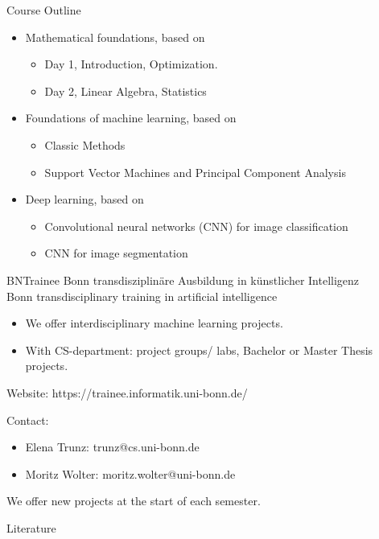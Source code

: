 \documentclass{beamer}
\begin{document}
    \begin{frame}{Course Outline}
      \begin{itemize}
        \item Mathematical foundations, based on \cite{deisenroth_faisal_ong_2020}
         \begin{itemize}
            \item  Day 1, Introduction, Optimization.
            \item  Day 2, Linear Algebra, Statistics
         \end{itemize}
        \item Foundations of machine learning, based on \cite{deisenroth_faisal_ong_2020}
        \begin{itemize}
          \item Classic Methods
          \item Support Vector Machines and Principal Component Analysis
        \end{itemize}
        \item Deep learning, based on \cite{Goodfellow_et_al_2016}
        \begin{itemize}
          \item Convolutional neural networks (CNN) for image classification
          \item CNN for image segmentation
        \end{itemize}
      \end{itemize}
    \end{frame}

    \begin{frame}{BNTrainee}
      Bonn transdisziplinäre Ausbildung in künstlicher Intelligenz \\
      Bonn transdisciplinary training in artificial intelligence
      \begin{itemize}
        \item We offer interdisciplinary machine learning projects.
        \item With CS-department: project groups/ labs, Bachelor or Master Thesis projects.
      \end{itemize}
      Website: https://trainee.informatik.uni-bonn.de/
      
      Contact:
      \begin{itemize}
        \item Elena Trunz: trunz@cs.uni-bonn.de
        \item Moritz Wolter: moritz.wolter@uni-bonn.de
      \end{itemize}
      We offer new projects at the start of each semester.
      \end{frame}
  

    \begin{frame}[allowframebreaks]{Literature}
      \printbibliography
    \end{frame}
\end{document}
